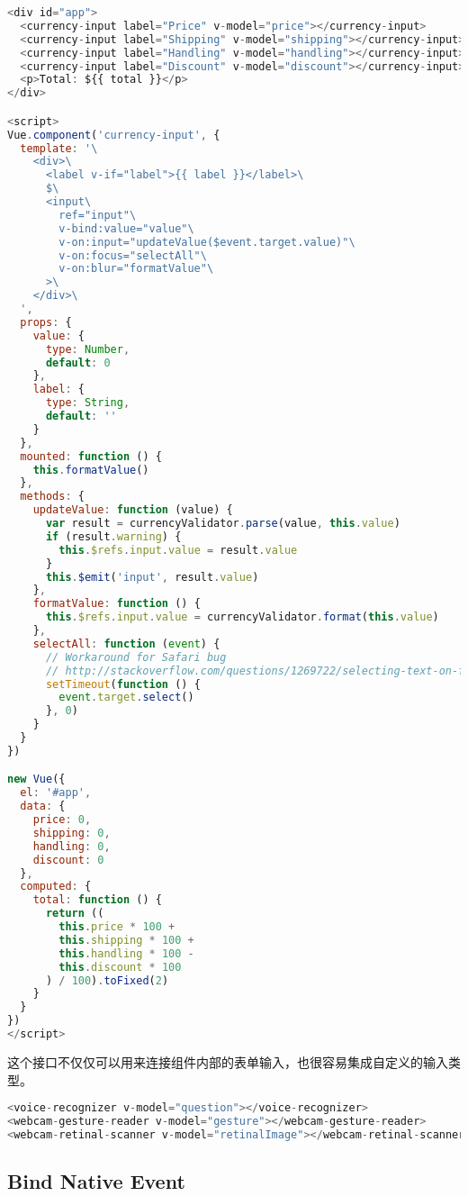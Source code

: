 \begin{lstlisting}[language=JavaScript]
<div id="app">
  <currency-input label="Price" v-model="price"></currency-input>
  <currency-input label="Shipping" v-model="shipping"></currency-input>
  <currency-input label="Handling" v-model="handling"></currency-input>
  <currency-input label="Discount" v-model="discount"></currency-input>
  <p>Total: ${{ total }}</p>
</div>

<script>
Vue.component('currency-input', {
  template: '\
    <div>\
      <label v-if="label">{{ label }}</label>\
      $\
      <input\
        ref="input"\
        v-bind:value="value"\
        v-on:input="updateValue($event.target.value)"\
        v-on:focus="selectAll"\
        v-on:blur="formatValue"\
      >\
    </div>\
  ',
  props: {
    value: {
      type: Number,
      default: 0
    },
    label: {
      type: String,
      default: ''
    }
  },
  mounted: function () {
    this.formatValue()
  },
  methods: {
    updateValue: function (value) {
      var result = currencyValidator.parse(value, this.value)
      if (result.warning) {
        this.$refs.input.value = result.value
      }
      this.$emit('input', result.value)
    },
    formatValue: function () {
      this.$refs.input.value = currencyValidator.format(this.value)
    },
    selectAll: function (event) {
      // Workaround for Safari bug
      // http://stackoverflow.com/questions/1269722/selecting-text-on-focus-using-jquery-not-working-in-safari-and-chrome
      setTimeout(function () {
      	event.target.select()
      }, 0)
    }
  }
})

new Vue({
  el: '#app',
  data: {
    price: 0,
    shipping: 0,
    handling: 0,
    discount: 0
  },
  computed: {
    total: function () {
      return ((
        this.price * 100 + 
        this.shipping * 100 + 
        this.handling * 100 - 
        this.discount * 100
      ) / 100).toFixed(2)
    }
  }
})
</script>
\end{lstlisting}


这个接口不仅仅可以用来连接组件内部的表单输入，也很容易集成自定义的输入类型。


\begin{lstlisting}[language=JavaScript]
<voice-recognizer v-model="question"></voice-recognizer>
<webcam-gesture-reader v-model="gesture"></webcam-gesture-reader>
<webcam-retinal-scanner v-model="retinalImage"></webcam-retinal-scanner>
\end{lstlisting}



\subsection{Bind Native Event}

